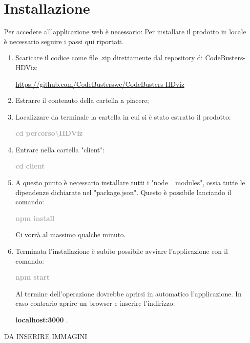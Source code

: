 \section{Installazione}
Per accedere all'applicazione web è necessario:
Per installare il prodotto in locale è necessario seguire i passi qui riportati.
\begin{enumerate}
	\item Scaricare il codice come file .zip direttamente dal repository di CodeBusters-HDViz:
		\begin{center}
			\textcolor{blue}{\url{https://github.com/CodeBusterswe/CodeBusters-HDviz}}
		\end{center}	
	\item Estrarre il contenuto della cartella a piacere;
	\item Localizzare da terminale la cartella in cui si è stato estratto il prodotto:  
		\begin{center}
			\textcolor{darkgray}{\textbf{cd percorso\textbackslash HDViz}}
 		\end{center}	
	\item Entrare nella cartella "client":
		\begin{center}
			\textcolor{darkgray}{\textbf{cd client}}
 		\end{center}	     
	\item A questo punto è necessario installare tutti i "node\_ modules", ossia tutte le dipendenze dichiarate nel "package.json". Questo è possibile lanciando il comando:
		\begin{center}
			\textcolor{darkgray}{\textbf{npm install}}
 		\end{center}		
	Ci vorrà al massimo qualche minuto. 
	\item Terminata l'installazione è subito possibile avviare l'applicazione con il comando:
		\begin{center}
			\textcolor{darkgray}{\textbf{npm start}}
 		\end{center}
	Al termine dell'operazione dovrebbe aprirsi in automatico l'applicazione. In caso contrario aprire un browser e inserire l'indirizzo:
	\begin{center}
		\textbf{localhost:3000} .
	\end{center}		
\end{enumerate}



DA INSERIRE IMMAGINI